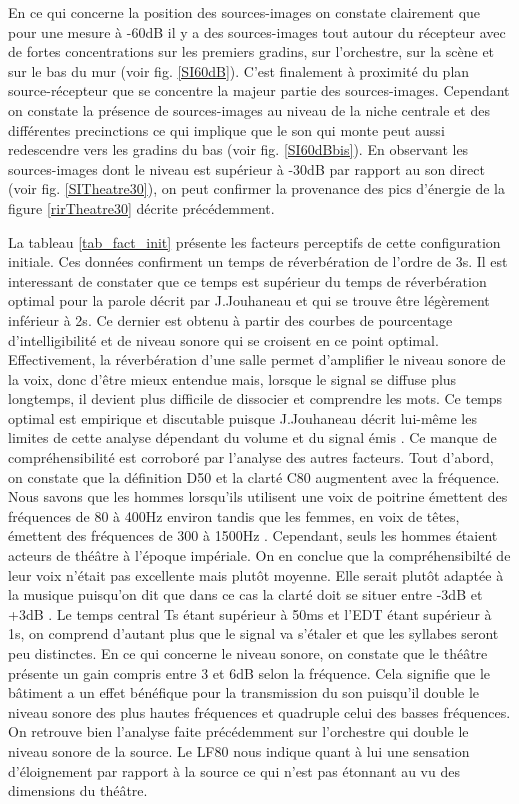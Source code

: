 %
En ce qui concerne la position des sources-images on constate clairement que pour une mesure à -60dB il y a des sources-images tout autour du récepteur avec de fortes concentrations sur les premiers gradins, sur l'orchestre, sur la scène et sur le bas du mur (voir fig. \ref{SI60dB}). C'est finalement à proximité du plan source-récepteur que se concentre la majeur partie des sources-images. Cependant on constate la présence de sources-images au niveau de la niche centrale et des différentes \glspl{precinction} ce qui implique que le son qui monte peut aussi redescendre vers les gradins du bas (voir fig. \ref{SI60dBbis}). En observant les sources-images dont le niveau est supérieur à -30dB par rapport au son direct (voir fig. \ref{SITheatre30}), on peut confirmer la provenance des pics d'énergie de la figure \ref{rirTheatre30} décrite précédemment. 

La tableau \ref{tab_fact_init} présente les facteurs perceptifs de cette configuration initiale. Ces données confirment un temps de réverbération de l'ordre de 3s. Il est interessant de constater que ce temps est supérieur du temps de réverbération optimal pour la parole décrit par J.Jouhaneau \cite[p.209]{jouhaneau} et qui se trouve être légèrement inférieur à 2s. Ce dernier est obtenu à partir des courbes de pourcentage d'intelligibilité et de niveau sonore qui se croisent en ce point optimal. Effectivement, la réverbération d'une salle permet d'amplifier le niveau sonore de la voix, donc d'être mieux entendue mais, lorsque le signal se diffuse plus longtemps, il devient plus difficile de dissocier et comprendre les mots. Ce temps optimal est empirique et discutable puisque J.Jouhaneau décrit lui-même les limites de cette analyse dépendant du volume et du signal émis \cite[p.218]{jouhaneau}. Ce manque de compréhensibilité est corroboré par l'analyse des autres facteurs. Tout d'abord, on constate que la définition \gls{D50} et la clarté \gls{C80} augmentent avec la fréquence. Nous savons que les hommes lorsqu'ils utilisent une voix de poitrine émettent des fréquences de 80 à 400Hz environ tandis que les femmes, en voix de têtes, émettent des fréquences de 300 à 1500Hz \cite[Mécanismes vocaux]{voix}. Cependant, seuls les hommes étaient acteurs de théâtre à l'époque impériale. On en conclue que la compréhensibilté de leur voix n'était pas excellente mais plutôt moyenne. Elle serait plutôt adaptée à la musique puisqu'on dit que dans ce cas la clarté doit se situer entre -3dB et +3dB \cite[p.59]{acoustique}. Le temps central \gls{Ts} étant supérieur à 50ms et l'\gls{EDT} étant supérieur à 1s, on comprend d'autant plus que le signal va s'étaler et que les syllabes seront peu distinctes. En ce qui concerne le niveau sonore, on constate que le théâtre présente un gain compris entre 3 et 6dB selon la fréquence. Cela signifie que le bâtiment a un effet bénéfique pour la transmission du son puisqu'il double le niveau sonore des plus hautes fréquences et quadruple celui des basses fréquences. On retrouve bien l'analyse faite précédemment sur l'orchestre qui double le niveau sonore de la source. Le \gls{LF80} nous indique quant à lui une sensation d'éloignement par rapport à la source ce qui n'est pas étonnant au vu des dimensions du théâtre.

